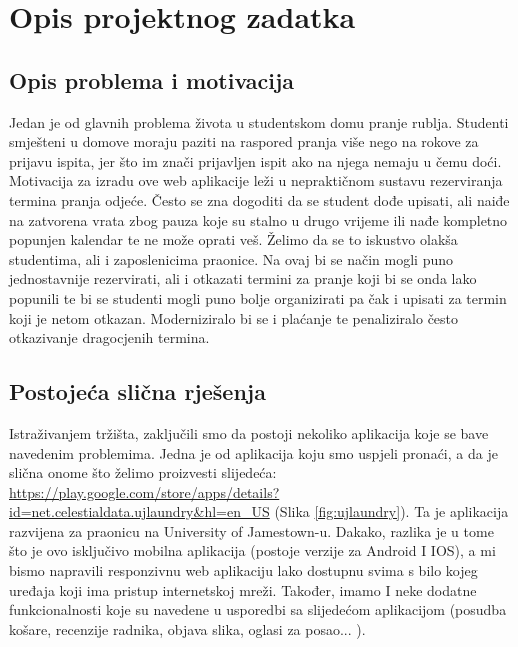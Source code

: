 \chapter{Opis projektnog zadatka}
		
		\section{Opis problema i motivacija}
		
			{Jedan je od glavnih problema života u studentskom domu pranje rublja. Studenti smješteni u domove
			moraju paziti na raspored pranja više nego na rokove za prijavu ispita, jer što im znači prijavljen ispit ako
			na njega nemaju u čemu doći. Motivacija za izradu ove web aplikacije leži u nepraktičnom sustavu
			rezerviranja termina pranja odjeće. Često se zna dogoditi da se student dođe upisati, ali naiđe na
			zatvorena vrata zbog pauza koje su stalno u drugo vrijeme ili nađe kompletno popunjen kalendar te ne
			može oprati veš. Želimo da se to iskustvo olakša studentima, ali i zaposlenicima praonice. Na ovaj bi se
			način mogli puno jednostavnije rezervirati, ali i otkazati termini za pranje koji bi se onda lako popunili te
			bi se studenti mogli puno bolje organizirati pa čak i upisati za termin koji je netom otkazan.
			Moderniziralo bi se i plaćanje te penaliziralo često otkazivanje dragocjenih termina.}
		
		\section{Postojeća slična rješenja}
		
			{Istraživanjem tržišta, zaključili smo da postoji nekoliko aplikacija koje se bave navedenim problemima.
			Jedna je od aplikacija koju smo uspjeli pronaći, a da je slična onome što želimo proizvesti slijedeća:
			\url{https://play.google.com/store/apps/details?id=net.celestialdata.ujlaundry&hl=en_US} (Slika  \ref{fig:ujlaundry}). Ta je aplikacija
			razvijena za praonicu na University of Jamestown-u. Dakako, razlika je u tome što je ovo isključivo
			mobilna aplikacija (postoje verzije za Android I IOS), a mi bismo napravili responzivnu web aplikaciju lako
			dostupnu svima s bilo kojeg uređaja koji ima pristup internetskoj mreži. Također, imamo I neke dodatne
			funkcionalnosti koje su navedene u usporedbi sa slijedećom aplikacijom (posudba košare, recenzije
			radnika, objava slika, oglasi za posao... ).}
		
